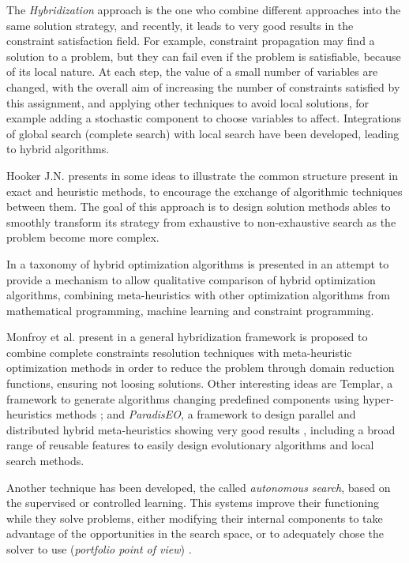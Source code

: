 The \textit{Hybridization} approach is the one who combine different approaches into the same solution strategy, and recently, it leads to very good results in the constraint satisfaction field. For example, constraint propagation may find a solution to a problem, but they can fail even if the problem is satisfiable, because of its local nature. At each step, the value of a small number of variables are changed, with the overall aim of increasing the number of constraints satisfied by this assignment, and applying other techniques to avoid local solutions, for example adding a stochastic component to choose variables to affect. Integrations of global search (complete search) with local search have been developed, leading to hybrid algorithms. 

Hooker J.N. presents in \cite{Hooker2012} some ideas to illustrate the common structure present in exact and heuristic methods, to encourage the exchange of algorithmic techniques between them. The goal of this approach is to design solution methods ables to smoothly transform its strategy from exhaustive to non-exhaustive search as the problem become more complex.

In \cite{El-Ghazali2013} a taxonomy of hybrid optimization algorithms is presented in an attempt to provide a mechanism to allow qualitative comparison of hybrid optimization algorithms, combining meta-heuristics with other optimization algorithms from mathematical programming, machine learning and constraint programming.

Monfroy et al. present in \cite{Monfroya,Monfroyb} a general hybridization framework is proposed to combine complete constraints resolution techniques with meta-heuristic optimization methods in order to reduce the problem through domain reduction functions, ensuring not loosing solutions. Other interesting ideas are {\sc Templar}, a framework to generate algorithms changing predefined components using hyper-heuristics methods \cite{Swan2015}; and {\it ParadisEO}, a framework to design parallel and distributed hybrid meta-heuristics showing very good results \cite{Cahon2004}, including a broad range of reusable features to easily design evolutionary algorithms and local search methods.

Another technique has been developed, the called {\it autonomous search}, based on the supervised or controlled learning. This systems improve their functioning while they solve problems, either  modifying their internal components to take advantage of the opportunities in the search space, or to adequately chose the solver to use ({\it portfolio point of view}) \cite{WhatIsAuto}.

